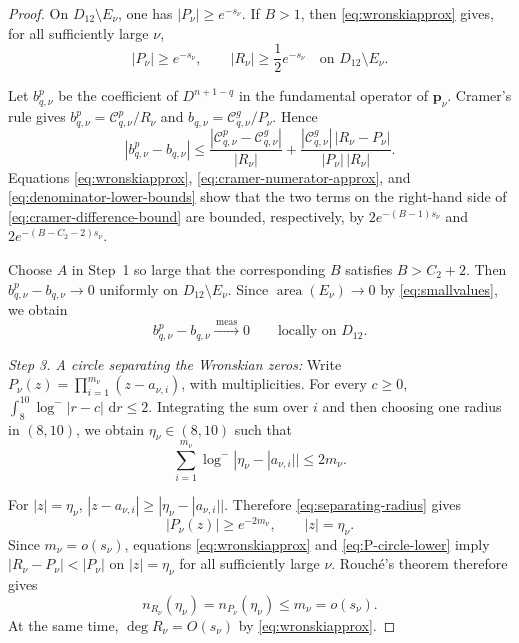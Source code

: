 \documentclass[12pt,letterpaper,reqno]{amsart}
\theoremstyle{definition}
\numberwithin{equation}{section}
\newcommand{\dd}{\,\mathrm d}
\newcommand{\convmeas}{\xrightarrow{\,\mathrm{meas}\,}}
\DeclareMathOperator{\meas}{area}
\newcommand{\pv}{\bm p}
\begin{document}
\begin{proof}
On \(D_{12}\setminus E_\nu\), one has
\(|P_\nu|\geq e^{-s_\nu}\). If \(B>1\), then
\eqref{eq:wronskiapprox} gives, for all sufficiently large \(\nu\),
\begin{equation}\label{eq:denominator-lower-bounds}
 |P_\nu|\geq e^{-s_\nu},
 \qquad
 |R_\nu|\geq\frac12e^{-s_\nu}
 \quad\text{on }D_{12}\setminus E_\nu.
\end{equation}

Let \(b_{q,\nu}^p\) be the coefficient of \(D^{n+1-q}\) in the
fundamental operator of \(\pv_\nu\). Cramer's rule gives
\(b_{q,\nu}^p=\mathcal C_{q,\nu}^p/R_\nu\) and
\(b_{q,\nu}=\mathcal C_{q,\nu}^g/P_\nu\). Hence
\begin{equation}\label{eq:cramer-difference-bound}
 \left|b_{q,\nu}^p-b_{q,\nu}\right|
 \leq
 \frac{|\mathcal C_{q,\nu}^p-\mathcal C_{q,\nu}^g|}
      {|R_\nu|}
 +
 \frac{|\mathcal C_{q,\nu}^g|\,|R_\nu-P_\nu|}
      {|P_\nu|\,|R_\nu|}.
\end{equation}
Equations \eqref{eq:wronskiapprox},
\eqref{eq:cramer-numerator-approx}, and
\eqref{eq:denominator-lower-bounds} show that the two terms on the
right-hand side of \eqref{eq:cramer-difference-bound} are bounded,
respectively, by
\(2e^{-(B-1)s_\nu}\) and
\(2e^{-(B-C_2-2)s_\nu}\).

Choose \(A\) in Step~1 so large that the corresponding \(B\) satisfies
\(B>C_2+2\). Then
\(b_{q,\nu}^p-b_{q,\nu}\to0\) uniformly on
\(D_{12}\setminus E_\nu\). Since
\(\meas(E_\nu)\to0\) by \eqref{eq:smallvalues}, we obtain
\begin{equation}\label{eq:cramercomparison}
 b_{q,\nu}^p-b_{q,\nu}
 \convmeas0
 \qquad\text{locally on }D_{12}.
\end{equation}


\medskip\noindent
\emph{{Step 3. A circle separating the Wronskian zeros:}}
Write
\(P_\nu(z)=\prod_{i=1}^{m_\nu}(z-a_{\nu,i})\), with multiplicities.
For every \(c\geq0\),
\(\int_8^{10}\log^-|r-c|\,\dd r\leq2\).
Integrating the sum over \(i\) and then choosing one radius in
\((8,10)\), we obtain \(\eta_\nu\in(8,10)\) such that
\begin{equation}\label{eq:separating-radius}
 \sum_{i=1}^{m_\nu}
 \log^-|\eta_\nu-|a_{\nu,i}||
 \leq2m_\nu.
\end{equation}

For \(|z|=\eta_\nu\),
\(|z-a_{\nu,i}|
 \geq|\eta_\nu-|a_{\nu,i}||\).
Therefore \eqref{eq:separating-radius} gives
\begin{equation}\label{eq:P-circle-lower}
 |P_\nu(z)|
 \geq e^{-2m_\nu},
 \qquad |z|=\eta_\nu.
\end{equation}
Since \(m_\nu=o(s_\nu)\), equations
\eqref{eq:wronskiapprox} and \eqref{eq:P-circle-lower} imply
\(|R_\nu-P_\nu|<|P_\nu|\) on \(|z|=\eta_\nu\) for all sufficiently
large \(\nu\). Rouch\'e's theorem therefore gives
\begin{equation}\label{eq:rouche-root-count}
 n_{R_\nu}(\eta_\nu)
 =
 n_{P_\nu}(\eta_\nu)
 \leq m_\nu
 =
 o(s_\nu).
\end{equation}
At the same time,
\(\deg R_\nu=O(s_\nu)\) by \eqref{eq:wronskiapprox}.



\end{proof}
\end{document}

